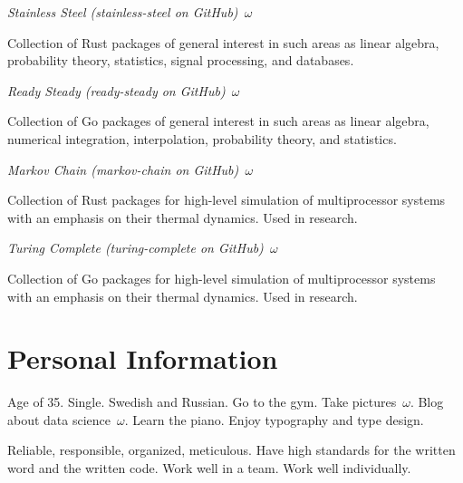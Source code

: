 \documentclass{article}
\begin{document}
\emph{Stainless Steel (stainless-steel on GitHub)~$\omega$}

Collection of Rust packages of general interest in such areas as linear algebra,
probability theory, statistics, signal processing, and databases.

\emph{Ready Steady (ready-steady on GitHub)~$\omega$}

Collection of Go packages of general interest in such areas as linear algebra,
numerical integration, interpolation, probability theory, and statistics.

\emph{Markov Chain (markov-chain on GitHub)~$\omega$}

Collection of Rust packages for high-level simulation of multiprocessor systems
with an emphasis on their thermal dynamics. Used in research.

\emph{Turing Complete (turing-complete on GitHub)~$\omega$}

Collection of Go packages for high-level simulation of multiprocessor systems
with an emphasis on their thermal dynamics. Used in research.

\section{Personal Information}

Age of 35. Single. Swedish and Russian. Go to the gym. Take pictures~$\omega$.
Blog about data science~$\omega$. Learn the piano. Enjoy typography and type
design.

Reliable, responsible, organized, meticulous. Have high standards for the
written word and the written code. Work well in a team. Work well individually.
\end{document}
